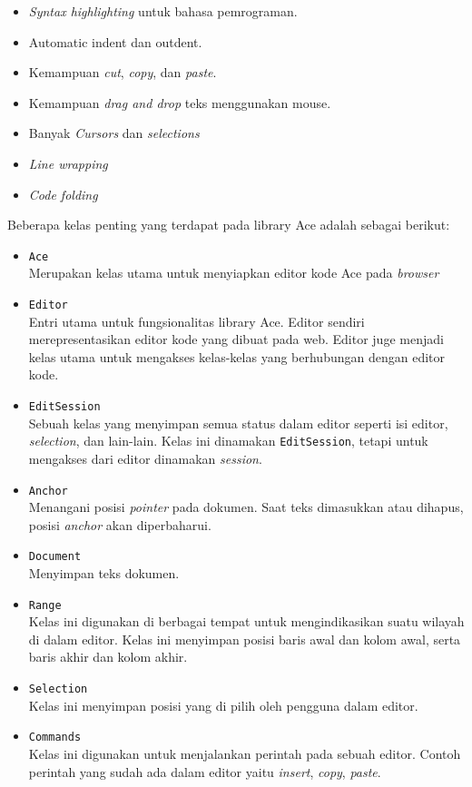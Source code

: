\documentclass[a4paper,twoside]{article}
\begin{document}
\begin{enumerate}
	      \begin{itemize}
		      \item \textit{Syntax highlighting} untuk bahasa pemrograman.
		      \item Automatic indent dan  outdent.
		      \item Kemampuan \textit{cut}, \textit{copy}, dan \textit{paste}.
		      \item Kemampuan \textit{drag and drop} teks menggunakan mouse.
		      \item Banyak \textit{Cursors} dan \textit{selections}
		      \item \textit{Line wrapping}
		      \item \textit{Code folding}
	      \end{itemize}

	      Beberapa kelas penting yang terdapat pada library Ace adalah sebagai berikut:

	      \begin{itemize}
		      \item \verb|Ace| \\
		            Merupakan kelas utama untuk menyiapkan editor kode Ace pada \textit{browser}
		      \item \verb|Editor| \\
		            Entri utama untuk fungsionalitas library Ace. Editor sendiri merepresentasikan editor kode yang dibuat pada web. Editor juge menjadi kelas utama untuk mengakses kelas-kelas yang berhubungan dengan editor kode.

		      \item \verb|EditSession| \\
		            Sebuah kelas yang menyimpan semua status dalam editor seperti isi editor, \textit{selection}, dan lain-lain. Kelas ini dinamakan \verb|EditSession|, tetapi untuk mengakses dari editor dinamakan \textit{session}.

		      \item \verb|Anchor| \\
		            Menangani posisi \textit{pointer} pada dokumen. Saat teks dimasukkan atau dihapus, posisi \textit{anchor} akan diperbaharui.
		      \item \verb|Document| \\
		            Menyimpan teks dokumen.
		      \item \verb|Range| \\
		            Kelas ini digunakan di berbagai tempat untuk mengindikasikan suatu wilayah di dalam editor. Kelas ini menyimpan posisi baris awal dan kolom awal, serta baris akhir dan kolom akhir.
		      \item \verb|Selection| \\
		            Kelas ini menyimpan posisi yang di pilih oleh pengguna dalam editor.
		      \item \verb|Commands| \\
		            Kelas ini digunakan untuk menjalankan perintah pada sebuah editor. Contoh perintah yang sudah ada dalam editor yaitu \textit{insert}, \textit{copy}, \textit{paste}.
	      \end{itemize}


\end{enumerate}
\end{document}
